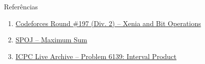 \begin{frame}[fragile]{Referências}

    \begin{enumerate}
        \item \href{http://codeforces.com/problemset/problem/339/D}{Codeforces Round \#197 (Div. 2) -- Xenia and Bit Operations}
 
        \item \href{https://www.spoj.com/problems/KGSS/}{SPOJ -- Maximum Sum}

        \item \href{https://icpcarchive.ecs.baylor.edu/index.php?option=onlinejudge&page=show_problem&problem=4150}{ICPC Live Archive -- Problem 6139: Interval Product}

    \end{enumerate}

\end{frame}
